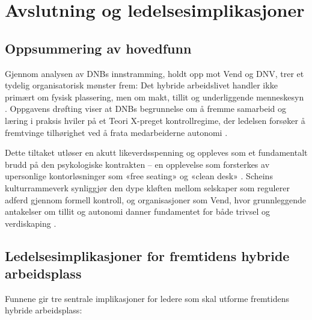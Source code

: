 \section{Avslutning og ledelsesimplikasjoner}

\subsection{Oppsummering av hovedfunn}
Gjennom analysen av DNBs innstramming, holdt opp mot Vend og DNV, trer et tydelig organisatorisk mønster frem: Det hybride arbeidslivet handler ikke primært om fysisk plassering, men om makt, tillit og underliggende menneskesyn \parencite{biernat2026, ingebrigtsen_vend_2026}. Oppgavens drøfting viser at DNBs begrunnelse om å fremme samarbeid og læring i praksis hviler på et Teori X-preget kontrollregime, der ledelsen forsøker å fremtvinge tilhørighet ved å frata medarbeiderne autonomi \parencite{biernat2026}.

Dette tiltaket utløser en akutt likeverdsspenning og oppleves som et fundamentalt brudd på den psykologiske kontrakten – en opplevelse som forsterkes av upersonlige kontorløsninger som «free seating» og «clean desk» \parencite{biernat2026, ingebrigtsen_dnv_2026}. Scheins kulturrammeverk synliggjør den dype kløften mellom selskaper som regulerer adferd gjennom formell kontroll, og organisasjoner som Vend, hvor grunnleggende antakelser om tillit og autonomi danner fundamentet for både trivsel og verdiskaping \parencite{biernat2026, ingebrigtsen_vend_2026}.

\subsection{Ledelsesimplikasjoner for fremtidens hybride arbeidsplass}
Funnene gir tre sentrale implikasjoner for ledere som skal utforme fremtidens hybride arbeidsplass:

